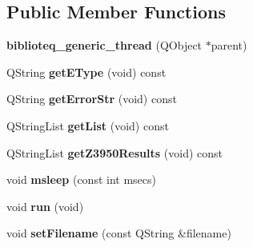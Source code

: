 \subsection*{Public Member Functions}
\begin{DoxyCompactItemize}
\item 
{\bfseries biblioteq\+\_\+generic\+\_\+thread} (Q\+Object $\ast$parent)\hypertarget{classbiblioteq__generic__thread_aba1b257af43aafe990cf012928628d2b}{}\label{classbiblioteq__generic__thread_aba1b257af43aafe990cf012928628d2b}

\item 
Q\+String {\bfseries get\+E\+Type} (void) const \hypertarget{classbiblioteq__generic__thread_aeb37767f6fcb34a1345a889e00e8a072}{}\label{classbiblioteq__generic__thread_aeb37767f6fcb34a1345a889e00e8a072}

\item 
Q\+String {\bfseries get\+Error\+Str} (void) const \hypertarget{classbiblioteq__generic__thread_a5c8bfa2834af961976e01150a34142fd}{}\label{classbiblioteq__generic__thread_a5c8bfa2834af961976e01150a34142fd}

\item 
Q\+String\+List {\bfseries get\+List} (void) const \hypertarget{classbiblioteq__generic__thread_a191e577716aca59e7329c4ae4f00cf96}{}\label{classbiblioteq__generic__thread_a191e577716aca59e7329c4ae4f00cf96}

\item 
Q\+String\+List {\bfseries get\+Z3950\+Results} (void) const \hypertarget{classbiblioteq__generic__thread_aca4e1283cc3941ceb723ce7b344792b8}{}\label{classbiblioteq__generic__thread_aca4e1283cc3941ceb723ce7b344792b8}

\item 
void {\bfseries msleep} (const int msecs)\hypertarget{classbiblioteq__generic__thread_a4606ad74dd05e6fbfc561bfb43cdd521}{}\label{classbiblioteq__generic__thread_a4606ad74dd05e6fbfc561bfb43cdd521}

\item 
void {\bfseries run} (void)\hypertarget{classbiblioteq__generic__thread_a02ab41780ec4bb298d13fe2738d75a59}{}\label{classbiblioteq__generic__thread_a02ab41780ec4bb298d13fe2738d75a59}

\item 
void {\bfseries set\+Filename} (const Q\+String \&filename)\hypertarget{classbiblioteq__generic__thread_af04acb7ed95a2e374a5602b444f66589}{}\label{classbiblioteq__generic__thread_af04acb7ed95a2e374a5602b444f66589}


\end{DoxyCompactItemize}
